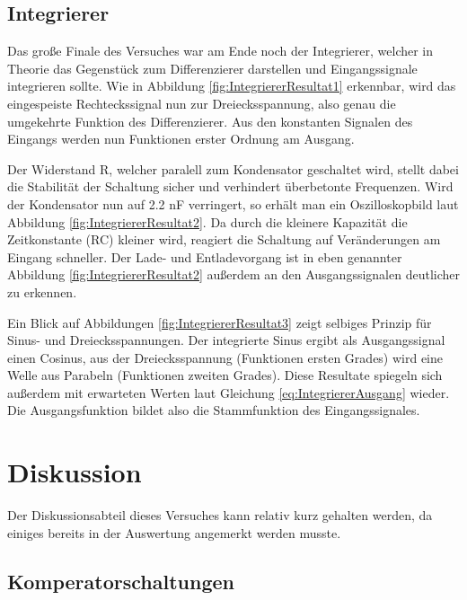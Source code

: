 \documentclass[12pt,a4paper,twoside]{article}
\begin{document}
\subsection{Integrierer}

Das große Finale des Versuches war am Ende noch der Integrierer, welcher in Theorie das Gegenstück zum Differenzierer darstellen und Eingangssignale integrieren sollte. 
Wie in Abbildung \ref{fig:IntegriererResultat1} erkennbar, wird das eingespeiste Rechteckssignal nun zur Dreiecksspannung, also genau die umgekehrte Funktion des Differenzierer. Aus den konstanten Signalen des Eingangs werden nun Funktionen erster Ordnung am Ausgang. \newline

\noindent
Der Widerstand R, welcher paralell zum Kondensator geschaltet wird, stellt dabei die Stabilität der Schaltung sicher und verhindert überbetonte Frequenzen. Wird der Kondensator nun auf 2.2 nF verringert, so erhält man ein Oszilloskopbild laut Abbildung \ref{fig:IntegriererResultat2}.
Da durch die kleinere Kapazität die Zeitkonstante (RC) kleiner wird, reagiert die Schaltung auf Veränderungen am Eingang schneller. Der Lade- und Entladevorgang ist in eben genannter Abbildung \ref{fig:IntegriererResultat2} außerdem an den Ausgangssignalen deutlicher zu erkennen. \newline

\noindent
Ein Blick auf Abbildungen \ref{fig:IntegriererResultat3} zeigt selbiges Prinzip für Sinus- und Dreiecksspannungen. Der integrierte Sinus ergibt als Ausgangssignal einen Cosinus, aus der Dreiecksspannung (Funktionen ersten Grades) wird eine Welle aus Parabeln (Funktionen zweiten Grades).
Diese Resultate spiegeln sich außerdem mit erwarteten Werten laut Gleichung \ref{eq:IntegriererAusgang} wieder. Die Ausgangsfunktion bildet also die Stammfunktion des Eingangssignales.




\section{Diskussion} %

Der Diskussionsabteil dieses Versuches kann relativ kurz gehalten werden, da einiges bereits in der Auswertung angemerkt werden musste.

\subsection{Komperatorschaltungen}
\end{document}
